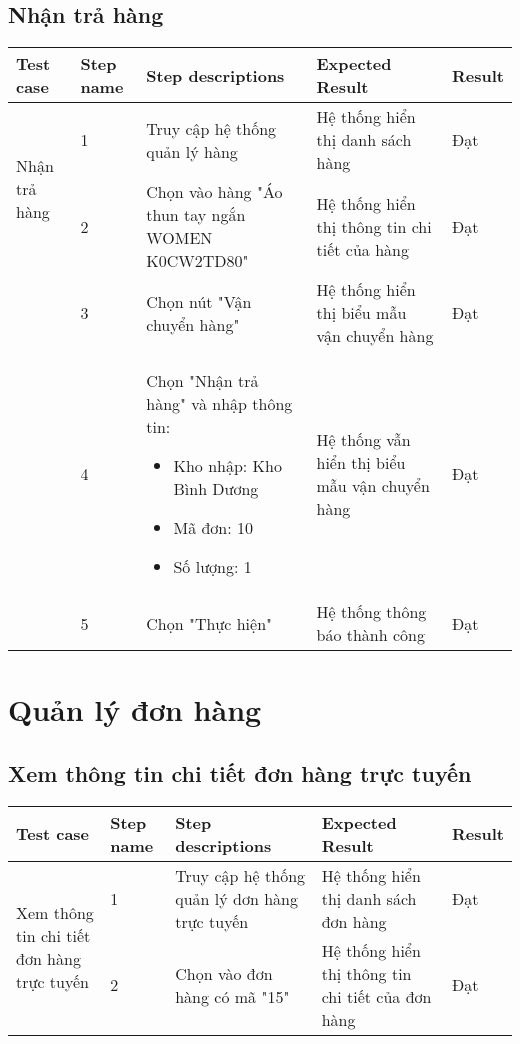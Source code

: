 \subsection{Nhận trả hàng}
{
    \setlength\extrarowheight{6pt}
    \begin{longtable}{| p{2.5cm}| p{1cm}| p{5.5cm}| p{4.5cm} | p{1.5cm} |}
        \hline
        \textbf{Test case} & \textbf{Step name} & \textbf{Step descriptions} & \textbf{Expected Result} & \textbf{Result} \\
        \hline
        \multirow[t]{2}{2.5cm}{Nhận trả hàng} & 1 & Truy cập hệ thống quản lý hàng & Hệ thống hiển thị danh sách hàng & Đạt \\
        \cline{2-5}
         & 2 & Chọn vào hàng "Áo thun tay ngắn WOMEN K0CW2TD80" & Hệ thống hiển thị thông tin chi tiết của hàng & Đạt \\
        \cline{2-5}
        & 3 & Chọn nút "Vận chuyển hàng" & Hệ thống hiển thị biểu mẫu vận chuyển hàng & Đạt \\
        \cline{2-5}
         & 4 & Chọn "Nhận trả hàng" và nhập thông tin:
         \begin{itemize}
            \item Kho nhập: Kho Bình Dương
            \item Mã đơn: 10
            \item Số lượng: 1
        \end{itemize}
         & Hệ thống vẫn hiển thị biểu mẫu vận chuyển hàng & Đạt \\
         \cline{2-5}
         & 5 & Chọn "Thực hiện" & Hệ thống thông báo thành công & Đạt \\
        \hline
    \end{longtable} 
}

\section{Quản lý đơn hàng}
\subsection{ Xem thông tin chi tiết đơn hàng trực tuyến}
{
    \setlength\extrarowheight{6pt}
    \begin{longtable}{| p{2.5cm}| p{1cm}| p{5.5cm}| p{4.5cm} | p{1.5cm} |}
        \hline
        \textbf{Test case} & \textbf{Step name} & \textbf{Step descriptions} & \textbf{Expected Result} & \textbf{Result} \\
        \hline
        \multirow[t]{2}{2.5cm}{ Xem thông tin chi tiết đơn hàng trực tuyến} & 1 & Truy cập hệ thống quản lý dơn hàng trực tuyến & Hệ thống hiển thị danh sách đơn hàng & Đạt \\
        \cline{2-5}
         & 2 & Chọn vào đơn hàng có mã "15" & Hệ thống hiển thị thông tin chi tiết của đơn hàng& Đạt \\
         \hline
    \end{longtable}
}

